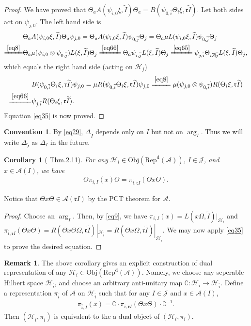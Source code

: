 \documentclass[12pt,a4paper]{article}
\theoremstyle{definition}
\newtheorem{rem}[df]{Remark}
\newtheorem{cv}[df]{Convention}
\theoremstyle{plain}
\newtheorem{co}[df]{Corollary}
\newcommand{\fk}{\mathfrak}
\newcommand{\mc}{\mathcal}
\newcommand{\wtd}{\widetilde}
\newcommand{\ovl}{\overline}
\newcommand{\Co}{\complement}
\newcommand{\RepdA}{\mathrm{Rep}^{\mathrm d}(\mc A)}
\newcommand{\Obj}{\mathrm{Obj}}
\numberwithin{equation}{section}
\begin{document}
\begin{proof}
We have proved that $\Theta_a A(\psi_{i,0}\xi,\wtd I)\Theta_a=B(\psi_{0,\ovl i}\Theta_i\xi,\fk r\wtd I)$. Let both sides act on $\psi_{j,0}$.  The left hand side is
\begin{align*}
&\Theta_a A(\psi_{i,0}\xi,\wtd I)\Theta_a\psi_{j,0}=\Theta_a A(\psi_{i,0}\xi,\wtd I)\psi_{0,\ovl j}\Theta_j=\Theta_a \mu L(\psi_{i,0}\xi,\wtd I)\psi_{0,\ovl j}\Theta_j\\
\xlongequal{\eqref{eq8}}&\Theta_a \mu(\psi_{i,0}\otimes\psi_{0,\ovl j})L(\xi,\wtd I)\Theta_j\xlongequal{\eqref{eq66}} \Theta_a \psi_{i,\ovl j}L(\xi,\wtd I)\Theta_j\xlongequal{\eqref{eq65}} \psi_{j,\ovl i}\Theta_{i\boxtimes\ovl j} L(\xi,\wtd I)\Theta_j,
\end{align*}
which equals the right hand side (acting on $\mc H_j$)
\begin{align*}
&B(\psi_{0,\ovl i}\Theta_i\xi,\fk r\wtd I)\psi_{j,0}=\mu R(\psi_{0,\ovl i}\Theta_i\xi,\fk r\wtd I)\psi_{j,0} \xlongequal{\eqref{eq8}} \mu(\psi_{j,0}\otimes\psi_{0,\ovl i})R(\Theta_i\xi,\fk r\wtd I)\\
\xlongequal{\eqref{eq66}}& \psi_{j,\ovl i}R(\Theta_i\xi,\fk r\wtd I).
\end{align*}
Equation \eqref{eq35} is now proved.
\end{proof}

\begin{cv}
By \eqref{eq29},  $\Delta_{\wtd I}$ depends only on $I$ but not on $\arg_I$. Thus we will write $\Delta_{\wtd I}$ as $\Delta_I$ in the future.
\end{cv}

\begin{co}[\cite{GL96} Thm.2.11]
For any $\mc H_i\in\Obj(\RepdA)$, $I\in\mc J$, and $x\in\mc A(I)$, we have
\begin{align}
\Theta\pi_{i,I}(x)\Theta=\pi_{\ovl i,\fk rI}(\Theta x\Theta).
\end{align}
\end{co}
Notice that $\Theta x \Theta\in\mc A(\fk rI)$ by the PCT theorem for $\mc A$.
\begin{proof}
Choose an $\arg_I$. Then, by \eqref{eq9}, we have $\pi_{i,I}(x)=L(x\Omega,\wtd I)|_{\mc H_i}$ and $\pi_{\ovl i,\fk rI}(\Theta x\Theta)=R(\Theta x\Theta\Omega,\fk r\wtd I)|_{\mc H_{\ovl i}}=R(\Theta x\Omega,\fk r\wtd I)|_{\mc H_{\ovl i}}$. We may now apply \eqref{eq35} to prove the desired equation.
\end{proof}


\begin{rem}
The above corollary gives an explicit construction of dual representation of any $\mc H_i\in\Obj(\RepdA)$. Namely, we choose any seperable Hilbert space $\mc H_{\ovl i}$, and choose an arbitrary anti-unitary map $\Co:\mc H_i\rightarrow\mc H_{\ovl i}$. Define a representation $\pi_{\ovl i}$ of $\mc A$ on $\mc H_{\ovl i}$ such that for any $I\in\mc J$ and $x\in\mc A(I)$,
\begin{align}
\pi_{\ovl i,I}(x)=\Co\cdot\pi_{i,\fk rI}(\Theta x\Theta)\cdot\Co^{-1}.
\end{align}
Then $(\mc H_{\ovl i},\pi_{\ovl i})$ is equivalent to the a dual object of $(\mc H_i,\pi_i)$.
\end{rem}
\end{document}
